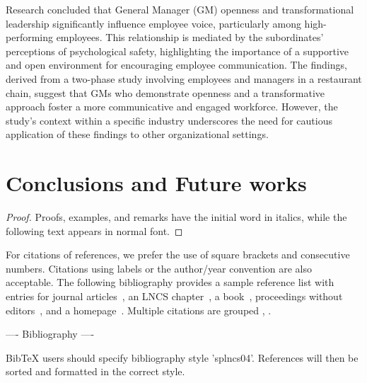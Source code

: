 \documentclass[runningheads]{llncs}
\begin{document}
Research concluded that General Manager (GM) openness and transformational leadership significantly influence employee voice, particularly among high-performing employees. This relationship is mediated by the subordinates' perceptions of psychological safety, highlighting the importance of a supportive and open environment for encouraging employee communication. The findings, derived from a two-phase study involving employees and managers in a restaurant chain, suggest that GMs who demonstrate openness and a transformative approach foster a more communicative and engaged workforce. However, the study's context within a specific industry underscores the need for cautious application of these findings to other organizational settings.

\section{Conclusions and Future works}

\newpage
\begin{proof}
Proofs, examples, and remarks have the initial word in italics,
while the following text appears in normal font.
\end{proof}
For citations of references, we prefer the use of square brackets
and consecutive numbers. Citations using labels or the author/year
convention are also acceptable. The following bibliography provides
a sample reference list with entries for journal
articles~\cite{smither2005relationship}, an LNCS chapter~\cite{ref_lncs1}, a
book~\cite{ref_book1}, proceedings without editors~\cite{ref_proc1},
and a homepage~\cite{ref_url1}. Multiple citations are grouped
\cite{ref_article1,ref_lncs1,ref_book1},
\cite{ref_article1,ref_book1,ref_proc1,ref_url1}.

---- Bibliography ----

BibTeX users should specify bibliography style 'splncs04'.
References will then be sorted and formatted in the correct style.

% 
% 









\end{document}
